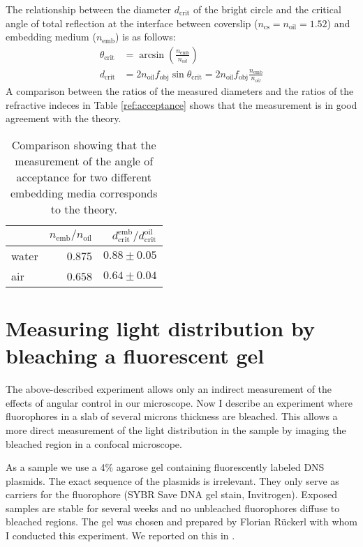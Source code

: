 The relationship between the diameter $d_\textrm{crit}$ of the bright
circle and the critical angle of total reflection at the interface
between coverslip ($n_\textrm{cs}=n_\textrm{oil}=1.52$) and embedding
medium ($n_\textrm{emb}$) is as follows:
\begin{align}
  \theta_\textrm{crit}&=\arcsin\left(\frac{n_\textrm{emb}}{n_{oil}}\right) \\
  d_\textrm{crit} &= 2 n_\textrm{oil} f_\textrm{obj}
  \sin\theta_\textrm{crit}= 2 n_\textrm{oil} f_\textrm{obj}
  \frac{n_\textrm{emb}}{n_{oil}}
\end{align}
A comparison between the ratios of the measured diameters and the
ratios of the refractive indeces in Table \ref{ref:acceptance} shows
that the measurement is in good agreement with the theory.
\begin{table}[!hbt]
  \centering
  \begin{tabular}{ l r r }
    & $n_\textrm{emb}/n_\textrm{oil}$ & $d^\textrm{emb}_\textrm{crit}/ d^\textrm{oil}_\textrm{crit}$ \\  \hline
    water & 0.875 & $0.88\pm0.05$ \\
    air & 0.658 & $0.64\pm0.04$ 
  \end{tabular}
  \caption{Comparison showing that the measurement of the angle of acceptance for two different embedding media corresponds to the theory.}
  \label{tab:acceptance}
\end{table}


\section{Measuring light distribution by bleaching a fluorescent gel}
The above-described experiment allows only an indirect measurement of the
effects of angular control in our microscope. Now I describe an
experiment where fluorophores in a slab of several microns thickness
are bleached. This allows a more direct measurement of the light
distribution in the sample by imaging the bleached region in a
confocal microscope.

As a sample we use a 4\% agarose gel containing fluorescently labeled
DNS plasmids. The exact sequence of the plasmids is irrelevant. They
only serve as carriers for the fluorophore (SYBR Save DNA gel stain,
Invitrogen). Exposed samples are stable for several weeks and no
unbleached fluorophores diffuse to bleached regions. The gel was
chosen and prepared by Florian R\"uckerl with whom I conducted this
experiment. We reported on this in \cite{Ruckerl}.


